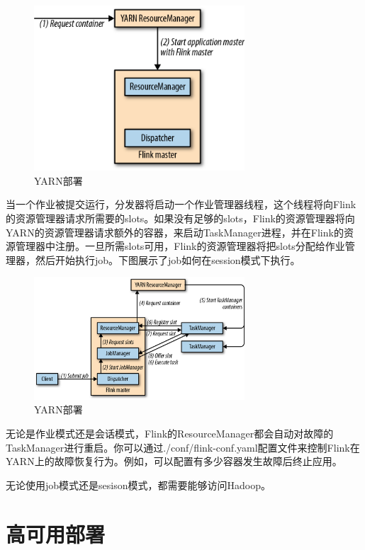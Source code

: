 \documentclass[cn,11pt,chinese]{elegantbook}
\begin{document}
\begin{figure}[htbp]
    \centering
    \includegraphics[width=0.7\textwidth]{images/spaf_0904.png}
    \caption{YARN部署}
\end{figure}

当一个作业被提交运行，分发器将启动一个作业管理器线程，这个线程将向Flink的资源管理器请求所需要的slots。如果没有足够的slots，Flink的资源管理器将向YARN的资源管理器请求额外的容器，来启动TaskManager进程，并在Flink的资源管理器中注册。一旦所需slots可用，Flink的资源管理器将把slots分配给作业管理器，然后开始执行job。下图展示了job如何在session模式下执行。

\begin{figure}[htbp]
    \centering
    \includegraphics[width=0.7\textwidth]{images/spaf_0905.png}
    \caption{YARN部署}
\end{figure}

无论是作业模式还是会话模式，Flink的ResourceManager都会自动对故障的TaskManager进行重启。你可以通过./conf/flink-conf.yaml配置文件来控制Flink在YARN上的故障恢复行为。例如，可以配置有多少容器发生故障后终止应用。

无论使用job模式还是sesison模式，都需要能够访问Hadoop。

\section{高可用部署}
\end{document}
